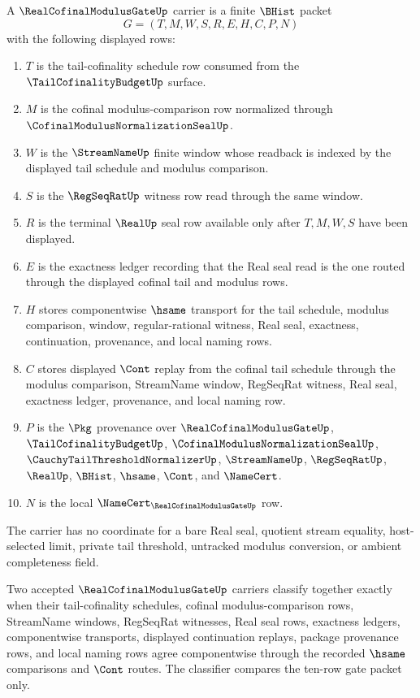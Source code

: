 \begin{definition}
\label{def:real-cofinal-modulus-gate-carrier}
A $\RealCofinalModulusGateUp$ carrier is a finite $\BHist$ packet
$$
G=(T,M,W,S,R,E,H,C,P,N)
$$
with the following displayed rows:
\begin{enumerate}
\item $T$ is the tail-cofinality schedule row consumed from the $\TailCofinalityBudgetUp$ surface.
\item $M$ is the cofinal modulus-comparison row normalized through $\CofinalModulusNormalizationSealUp$.
\item $W$ is the $\StreamNameUp$ finite window whose readback is indexed by the displayed tail schedule and modulus comparison.
\item $S$ is the $\RegSeqRatUp$ witness row read through the same window.
\item $R$ is the terminal $\RealUp$ seal row available only after $T,M,W,S$ have been displayed.
\item $E$ is the exactness ledger recording that the Real seal read is the one routed through the displayed cofinal tail and modulus rows.
\item $H$ stores componentwise $\hsame$ transport for the tail schedule, modulus comparison, window, regular-rational witness, Real seal, exactness, continuation, provenance, and local naming rows.
\item $C$ stores displayed $\Cont$ replay from the cofinal tail schedule through the modulus comparison, StreamName window, RegSeqRat witness, Real seal, exactness ledger, provenance, and local naming row.
\item $P$ is the $\Pkg$ provenance over $\RealCofinalModulusGateUp$, $\TailCofinalityBudgetUp$, $\CofinalModulusNormalizationSealUp$, $\CauchyTailThresholdNormalizerUp$, $\StreamNameUp$, $\RegSeqRatUp$, $\RealUp$, $\BHist$, $\hsame$, $\Cont$, and $\NameCert$.
\item $N$ is the local $\NameCert_{\RealCofinalModulusGateUp}$ row.
\end{enumerate}
The carrier has no coordinate for a bare Real seal, quotient stream equality, host-selected limit, private tail threshold, untracked modulus conversion, or ambient completeness field.
\end{definition}

\begin{definition}
\label{def:real-cofinal-modulus-gate-classifier}
Two accepted $\RealCofinalModulusGateUp$ carriers classify together exactly when their tail-cofinality schedules, cofinal modulus-comparison rows, StreamName windows, RegSeqRat witnesses, Real seal rows, exactness ledgers, componentwise transports, displayed continuation replays, package provenance rows, and local naming rows agree componentwise through the recorded $\hsame$ comparisons and $\Cont$ routes. The classifier compares the ten-row gate packet only.
\end{definition}

